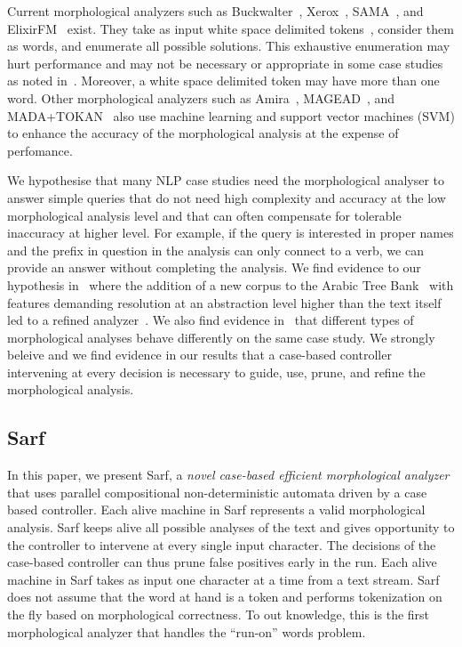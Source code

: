\documentclass[11pt,letterpaper]{article}
\begin{document}
Current morphological analyzers such as 
Buckwalter~,
Xerox~\cite{Beesley:01}, SAMA~\cite{Kulick:10},
and ElixirFM~\cite{Otakar:07} exist.
They take as input white space delimited tokens~\cite{Kulick:10},
consider them as words,
and enumerate all possible solutions. 
This exhaustive enumeration may hurt performance and may
not be necessary or appropriate
in some case studies as noted in~\cite{Maamouri:10}. 
Moreover, a white space delimited token may have 
more than one word.
Other morphological analyzers such as Amira~\cite{Diab:07,Benajiba:07},
MAGEAD~\cite{Habash:05}, and MADA+TOKAN~\cite{Habash:09} 
also use machine learning and support vector machines (SVM) 
to enhance the accuracy of the morphological analysis at the expense 
of perfomance.

We hypothesise that many NLP case studies need the 
morphological analyser to answer simple queries that do not need 
high complexity and accuracy at the low morphological analysis level 
and that can often compensate for tolerable inaccuracy at higher level. 
For example, if the query is interested in proper names and the 
prefix in question in the analysis can only connect to a verb, 
we can provide an answer without completing the analysis. 
We find evidence to our hypothesis in~\cite{Maamouri:10} where the 
addition of a new corpus to the Arabic Tree Bank~\cite{Maamouri:04}
with features demanding resolution at an abstraction level
higher than the text itself
led to a refined analyzer~\cite{Kulick:10}.  
We also find evidence in~\cite{Habash:06} that different types of 
morphological analyses behave differently on the same case study. 
We strongly beleive and we find evidence in our results that a 
case-based controller intervening at every decision is necessary to 
guide, use, prune, and refine the morphological analysis.

\subsection{Sarf}
\label{sec:intro:sarf}

In this paper, we present Sarf, a {\em novel case-based efficient
morphological analyzer} that uses parallel compositional 
non-deterministic automata driven by a case based controller.
Each alive machine in Sarf represents a valid morphological analysis. 
Sarf keeps alive all possible analyses of the text and gives 
opportunity to the controller to intervene at every single input 
character. 
The decisions of the case-based controller can thus prune false 
positives early in the run. 
Each alive machine in Sarf takes as input one character at a time 
from a text stream. 
Sarf does not assume that the word at hand is a token and
performs tokenization on the fly based on morphological correctness.
To out knowledge, this is the first morphological analyzer that 
handles the ``run-on'' words problem. 
\end{document}
